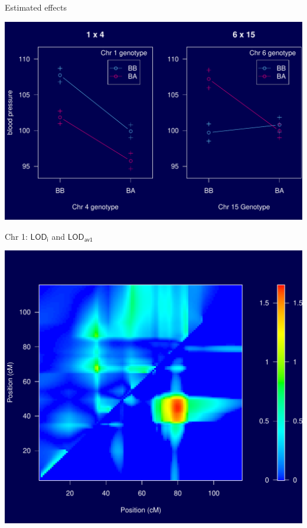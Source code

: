 \documentclass[12pt]{article}
\newcommand{\headsize}{\fontsize{35}{35} \selectfont}
\newcommand{\lod}{\text{LOD}}
\begin{document}
\newpage

\headsize \color{myyellow}
\hfill \begin{minipage}{5.75in}
\centering
Estimated effects
\end{minipage}

\vfill

\centerline{\includegraphics{FigsB/ieffects.pdf}}


\newpage

\headsize \color{myyellow}
\hfill \begin{minipage}{5.75in}
\centering
Chr 1: $\mathsf{\lod_i}$ and $\mathsf{\lod_{av1}}$
\end{minipage}

\vfill

\centerline{\includegraphics{FigsB/2dscan_chr1.pdf}}
\end{document}
